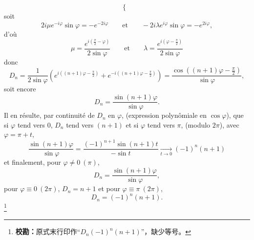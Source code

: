 \begin{enumerate}[label=\arabic*.,leftmargin=2.2em,itemsep=1.2em]
\[\begin{cases}
\end{cases}
\]
soit
\[
2i\mu e^{-i\varphi}\sin\varphi=-e^{-2i\varphi}
\qquad\text{et}\qquad
-2i\lambda e^{i\varphi}\sin\varphi=-e^{2i\varphi},
\]
d'où
\[
\mu=\frac{e^{i(\frac\pi2-\varphi)}}{2\sin\varphi}
\qquad\text{et}\qquad
\lambda=\frac{e^{i(\varphi-\frac\pi2)}}{2\sin\varphi}
\]
donc
\[
D_n=\frac1{2\sin\varphi}\left(e^{i((n+1)\varphi-\frac\pi2)}+e^{-i((n+1)\varphi-\frac\pi2)}\right)
=\frac{\cos((n+1)\varphi-\frac\pi2)}{\sin\varphi},
\]
soit encore
\[
D_n=\frac{\sin(n+1)\varphi}{\sin\varphi}.
\]
Il en résulte, par continuité de $D_n$ en $\varphi$, (expression polynômiale en $\cos\varphi$), que si $\varphi$ tend vers 0, $D_n$ tend vers $(n+1)$ et si $\varphi$ tend vers $\pi$, (modulo $2\pi$), avec $\varphi=\pi+t$,
\[
\frac{\sin(n+1)\varphi}{\sin\varphi}
=\frac{(-1)^{n+1}\sin(n+1)t}{-\sin t}\underset{t\to0}{\longrightarrow}(-1)^n(n+1)
\]
et finalement, pour $\varphi\ne0\ (\pi)$,
\[
D_n=\frac{\sin(n+1)\varphi}{\sin\varphi},
\]
pour $\varphi\equiv0\ (2\pi)$, $D_n=n+1$ et pour $\varphi\equiv\pi\ (2\pi)$,
\[
D_n=(-1)^n(n+1).
\]
\mbox{}\footnote{\textbf{校勘：}原式末行印作“$D_n(-1)^n(n+1)$”，缺少等号。}

\end{enumerate}
